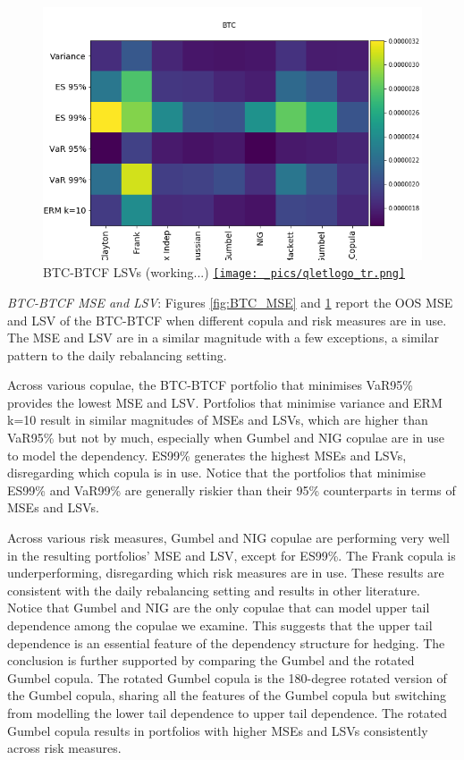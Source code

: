 \documentclass[11pt,a4paper,english]{article}
\begin{document}
\begin{figure}[t]
\includegraphics[width=\textwidth]{_pics/revision_BTC_LSVs.png}
  \caption{BTC-BTCF LSVs (working...)
  \href{http://www.quantlet.com/}{\texttt{[image: \_pics/qletlogo\_tr.png]}} }
\label{fig:BTC_LSV}
\end{figure}

\textit{BTC-BTCF MSE and LSV}: Figures \ref{fig:BTC_MSE} and \ref{fig:BTC_LSV}  report the OOS MSE and LSV of the BTC-BTCF when different copula and risk measures are in use.
The MSE and LSV are in a similar magnitude with a few exceptions, a similar pattern to the daily rebalancing setting.

Across various copulae, the BTC-BTCF portfolio that minimises VaR95\% provides the lowest MSE and LSV.
Portfolios that minimise variance and ERM k=10 result in similar magnitudes of MSEs and LSVs, which are higher than VaR95\% but not by much,
especially when Gumbel and NIG copulae are in use to model the dependency. ES99\% generates the highest MSEs and LSVs,
disregarding which copula is in use. Notice that the portfolios that minimise ES99\% and VaR99\% are generally riskier than their 95\% counterparts in terms of MSEs and LSVs.

Across various risk measures, Gumbel and NIG copulae are performing very well in the resulting portfolios’ MSE and LSV, except for ES99\%.
The Frank copula is underperforming, disregarding which risk measures are in use.
These results are consistent with the daily rebalancing setting and results in other literature.
Notice that Gumbel and NIG are the only copulae that can model upper tail dependence among the copulae we examine.
This suggests that the upper tail dependence is an essential feature of the dependency structure for hedging.
The conclusion is further supported by comparing the Gumbel and the rotated Gumbel copula.
The rotated Gumbel copula is the 180-degree rotated version of the Gumbel copula, sharing all the features of the Gumbel copula but switching from modelling the lower tail dependence to upper tail dependence.
The rotated Gumbel copula results in portfolios with higher MSEs and LSVs consistently across risk measures.
\end{document}
